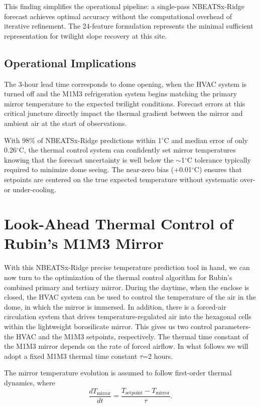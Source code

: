 \documentclass[twocolumn]{aastex631}
\begin{document}
This finding simplifies the operational pipeline: a single-pass NBEATSx-Ridge forecast achieves optimal accuracy without the computational overhead of iterative refinement. The 24-feature formulation represents the minimal sufficient representation for twilight slope recovery at this site.

\subsection{Operational Implications}

The 3-hour lead time corresponds to dome opening, when the HVAC system is turned off and the M1M3 refrigeration system begins matching the primary mirror temperature to the expected twilight conditions. Forecast errors at this critical juncture directly impact the thermal gradient between the mirror and ambient air at the start of observations.

With 98\% of NBEATSx-Ridge predictions within 1$^\circ$C and median error of only 0.26$^\circ$C, the thermal control system can confidently set mirror temperatures knowing that the forecast uncertainty is well below the $\sim$1$^\circ$C tolerance typically required to minimize dome seeing. The near-zero bias ($+$0.01$^\circ$C) ensures that setpoints are centered on the true expected temperature without systematic over- or under-cooling.

\section{Look-Ahead Thermal Control of Rubin's M1M3 Mirror}

With this NBEATSx-Ridge precise temperature prediction tool in hand, we can now turn to the optimization of the thermal control algorithm for Rubin's combined primary and tertiary mirror. During the daytime, when the enclose is closed, the HVAC system can be used to control the temperature of the air in the dome, in which the mirror is immersed. In addition, there is a forced-air circulation system that drives temperature-regulated air into the hexagonal cells within the lightweight borosilicate mirror. This gives us two control parameters- the HVAC and the M1M3 setpoints, respectively. The thermal time constant of the M1M3 mirror depends on the rate of forced airflow. In what follows we will adopt a fixed M1M3 thermal time constant $\tau$=2 hours. 

The mirror temperature evolution is assumed to follow first-order thermal dynamics, where
\begin{equation}
\frac{dT_{\text{mirror}}}{dt} = \frac{T_{\text{setpoint}} - T_{\text{mirror}}}{\tau}.
\label{eq:dynamics}
\end{equation}
\end{document}
